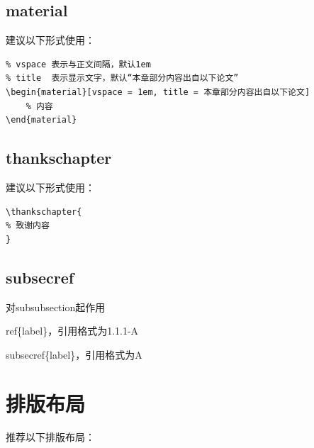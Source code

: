 \documentclass{nuistthesis}
\begin{document}
\subsection{material}

建议以下形式使用：

\begin{lstlisting}
% vspace 表示与正文间隔，默认1em
% title  表示显示文字，默认“本章部分内容出自以下论文”
\begin{material}[vspace = 1em, title = 本章部分内容出自以下论文]
    % 内容
\end{material}
\end{lstlisting}


\subsection{thankschapter}

建议以下形式使用：

\begin{lstlisting}
\thankschapter{
% 致谢内容
}
\end{lstlisting}


\subsection{subsecref}

对subsubsection起作用

ref\{label\}，引用格式为1.1.1-A

subsecref\{label\}，引用格式为A


\section{排版布局}

推荐以下排版布局：
\end{document}
